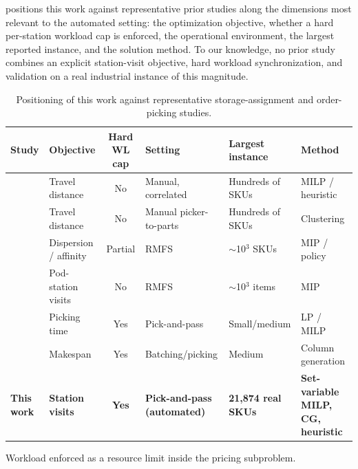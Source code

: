 \documentclass[preprint,review,11pt,authoryear]{elsarticle}
\begin{document}
 positions this work against representative prior studies along the dimensions most relevant to the automated setting: the optimization objective, whether a hard per-station workload cap is enforced, the operational environment, the largest reported instance, and the solution method. To our knowledge, no prior study combines an explicit station-visit objective, hard workload synchronization, and validation on a real industrial instance of this magnitude.

\begin{table}[H]
  \centering
  \scriptsize\setlength{\tabcolsep}{4pt}
  \begin{threeparttable}
  \begin{tabularx}{\linewidth}{@{}l l c l l >{\raggedright\arraybackslash}X@{}}
    \toprule
    \textbf{Study} & \textbf{Objective} & \textbf{Hard WL cap} & \textbf{Setting} & \textbf{Largest instance} & \textbf{Method} \\
    \midrule
    \cite{zhang2019cie}    & Travel distance      & No  & Manual, correlated   & Hundreds of SKUs  & MILP / heuristic \\
    \cite{wang2020}        & Travel distance      & No  & Manual picker-to-parts & Hundreds of SKUs & Clustering \\
    \cite{mirzaei2021}     & Dispersion / affinity & Partial & RMFS            & $\sim$10$^3$ SKUs & MIP / policy \\
    \cite{xie2021}         & Pod-station visits   & No  & RMFS                 & $\sim$10$^3$ items & MIP \\
    \cite{tarczynski2023}  & Picking time         & Yes & Pick-and-pass        & Small/medium      & LP / MILP \\
    \cite{muter2022}       & Makespan             & Yes\tnote{a} & Batching/picking & Medium            & Column generation \\
    \textbf{This work}     & \textbf{Station visits} & \textbf{Yes} & \textbf{Pick-and-pass (automated)} & \textbf{21,874 real SKUs} & \textbf{Set-variable MILP, CG, heuristic} \\
    \bottomrule
  \end{tabularx}
  \begin{tablenotes}\scriptsize
    \item[a] Workload enforced as a resource limit inside the pricing subproblem.
  \end{tablenotes}
  \end{threeparttable}
  \caption{Positioning of this work against representative storage-assignment and order-picking studies.}
  \label{tab:lit_comparison}
\end{table}
\end{document}
